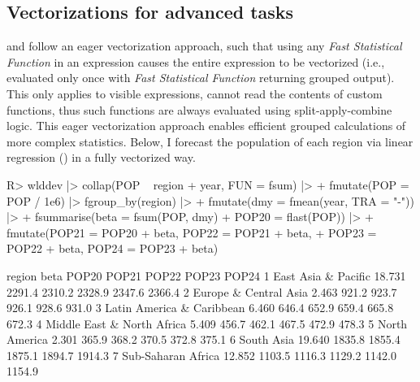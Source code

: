 \documentclass[nojss]{jss} %
\newcommand{\fct}[1]{\code{#1()}}
\begin{document}
\subsection{Vectorizations for advanced tasks} \label{ssec:vfat}
%
\fct{fsummarise} and \fct{fmutate} follow an eager vectorization approach, such that using any \emph{Fast Statistical Function} in an expression causes the entire expression to be vectorized (i.e., evaluated only once with \emph{Fast Statistical Function} returning grouped output). This only applies to visible expressions,  cannot read the contents of custom functions, thus such functions are always evaluated using split-apply-combine logic. This eager vectorization approach enables efficient grouped calculations of more complex statistics. Below, I forecast the population of each region via linear regression () in a fully vectorized way.
%
\begin{Schunk}
\begin{Sinput}
R> wlddev |> collap(POP ~ region + year, FUN = fsum) |>
+    fmutate(POP = POP / 1e6) |> fgroup_by(region) |>
+    fmutate(dmy = fmean(year, TRA = "-")) |>
+    fsummarise(beta = fsum(POP, dmy) %/=% fsum(dmy, dmy),
+               POP20 = flast(POP)) |>
+    fmutate(POP21 = POP20 + beta, POP22 = POP21 + beta,
+            POP23 = POP22 + beta, POP24 = POP23 + beta)
\end{Sinput}
\begin{Soutput}
                      region   beta  POP20  POP21  POP22  POP23  POP24
1        East Asia & Pacific 18.731 2291.4 2310.2 2328.9 2347.6 2366.4
2      Europe & Central Asia  2.463  921.2  923.7  926.1  928.6  931.0
3  Latin America & Caribbean  6.460  646.4  652.9  659.4  665.8  672.3
4 Middle East & North Africa  5.409  456.7  462.1  467.5  472.9  478.3
5              North America  2.301  365.9  368.2  370.5  372.8  375.1
6                 South Asia 19.640 1835.8 1855.4 1875.1 1894.7 1914.3
7         Sub-Saharan Africa 12.852 1103.5 1116.3 1129.2 1142.0 1154.9
\end{Soutput}
\end{Schunk}
%
\end{document}
